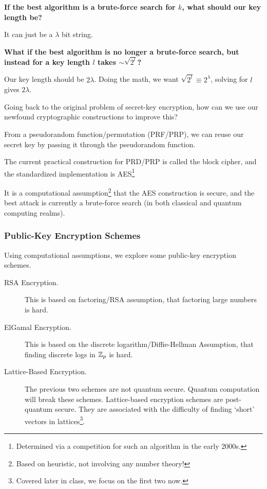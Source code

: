 \begin{example}
    \textbf{If the best algorithm is a brute-force search for $k$, what should our key length be?}

    It can just be a $\lambda$ bit string.
\end{example}
\begin{example*}
    \textbf{What if the best algorithm is no longer a brute-force search, but instead for a key length $l$ takes $\sim \sqrt{2^l}$?}

    Our key length should be $2\lambda$. Doing the math, we want $\sqrt{2^l} \equiv 2^\lambda$, solving for $l$ gives $2\lambda$.
\end{example*}

Going back to the original problem of secret-key encryption, how can we use our newfound cryptographic constructions to improve this?

From a pseudorandom function/permutation (PRF/PRP), we can reuse our secret key by passing it through the pseudorandom function.

The current practical construction for PRD/PRP is called the block cipher, and the standardized implementation is AES\footnote{Determined via a competition for such an algorithm in the early 2000s. }

It is a computational assumption\footnote{Based on heuristic, not involving any number theory!} that the AES construction is secure, and the best attack is currently a brute-force search (in both classical and quantum computing realms).

\subsubsection{Public-Key Encryption Schemes}
Using computational assumptions, we explore some public-key encryption schemes.

\begin{description}
    \item[RSA Encryption.] This is based on factoring/RSA assumption, that factoring large numbers is hard.
    \item[ElGamal Encryption.] This is based on the discrete logarithm/Diffie-Hellman Assumption, that finding discrete logs in $\mathbb Z_p$ is hard.
    \item[Lattice-Based Encryption.] The previous two schemes are not quantum secure. Quantum computation will break these schemes. Lattice-based encryption schemes are post-quantum secure. They are associated with the difficulty of finding `short' vectors in lattices\footnote{Covered later in class, we focus on the first two now.}.
\end{description}

